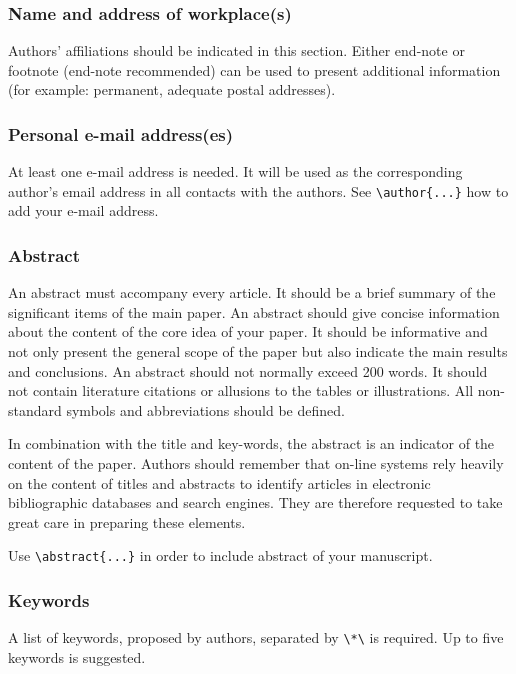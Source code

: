 \documentclass{lpaper} %
\begin{document}
\subsubsection{Name and address of workplace(s)}

Authors' affiliations should be indicated in this section. Either end-note or footnote (end-note recommended) can be used to present additional information (for example: permanent, adequate postal addresses).

\subsubsection{Personal e-mail address(es)}

At least one e-mail address is needed. It will be used as the corresponding author's email address in all contacts with the authors. See  {\tt \verb+\author{...}+} how to add your e-mail address.

\subsubsection{Abstract}

An abstract must accompany every article. It should be a brief summary of the significant items of the main paper. An abstract should give concise information about the content of the core idea of your paper. It should be informative and not only present the general scope of the paper but also indicate the main results and conclusions. An abstract should not normally exceed 200 words. It should not contain literature citations or allusions to the tables or illustrations. All non-standard symbols and abbreviations should be defined.

In combination with the title and key-words, the abstract is an indicator of the content of the paper. Authors should remember that on-line systems rely heavily on the content of titles and abstracts to identify articles in electronic bibliographic databases and search engines. They are therefore requested to take great care in preparing these elements.

Use {\tt \verb+\abstract{...}+} in order to include abstract of your manuscript.

\subsubsection{Keywords}

A list of keywords, proposed by authors, separated by {\tt \verb+\*\+}  is required. Up to five keywords is suggested.
\end{document}
